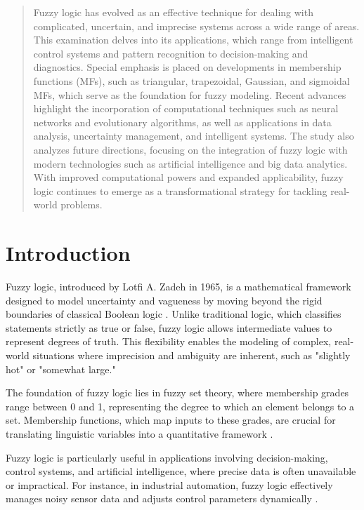 \documentclass[a4paper,12pt]{report}
\begin{document}
\begin{abstract}
    Fuzzy logic has evolved as an effective technique for dealing with complicated, uncertain, and imprecise systems across a wide range of areas. This examination delves into its applications, which range from intelligent control systems and pattern recognition to decision-making and diagnostics. Special emphasis is placed on developments in membership functions (MFs), such as triangular, trapezoidal, Gaussian, and sigmoidal MFs, which serve as the foundation for fuzzy modeling. Recent advances highlight the incorporation of computational techniques such as neural networks and evolutionary algorithms, as well as applications in data analysis, uncertainty management, and intelligent systems. The study also analyzes future directions, focusing on the integration of fuzzy logic with modern technologies such as artificial intelligence and big data analytics. With improved computational powers and expanded applicability, fuzzy logic continues to emerge as a transformational strategy for tackling real-world problems.
\end{abstract}

\tableofcontents
\newpage

\chapter{Introduction}
Fuzzy logic, introduced by Lotfi A. Zadeh in 1965, is a mathematical framework designed to model uncertainty and vagueness by moving beyond the rigid boundaries of classical Boolean logic \cite{zadeh1965fuzzy}. Unlike traditional logic, which classifies statements strictly as true or false, fuzzy logic allows intermediate values to represent degrees of truth. This flexibility enables the modeling of complex, real-world situations where imprecision and ambiguity are inherent, such as "slightly hot" or "somewhat large."

The foundation of fuzzy logic lies in fuzzy set theory, where membership grades range between 0 and 1, representing the degree to which an element belongs to a set. Membership functions, which map inputs to these grades, are crucial for translating linguistic variables into a quantitative framework .

Fuzzy logic is particularly useful in applications involving decision-making, control systems, and artificial intelligence, where precise data is often unavailable or impractical. For instance, in industrial automation, fuzzy logic effectively manages noisy sensor data and adjusts control parameters dynamically .
\end{document}
